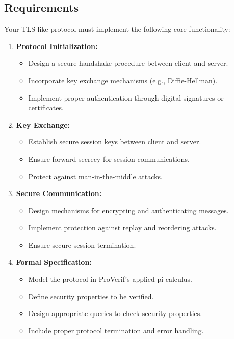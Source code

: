 \documentclass[10pt,a4paper,american]{exam}
\begin{document}
\subsection*{Requirements}
Your TLS-like protocol must implement the following core functionality:

\begin{enumerate}
	\item \textbf{Protocol Initialization:}
	      \begin{itemize}
		      \item Design a secure handshake procedure between client and server.
		      \item Incorporate key exchange mechanisms (e.g., Diffie-Hellman).
		      \item Implement proper authentication through digital signatures or certificates.
	      \end{itemize}

	\item \textbf{Key Exchange:}
	      \begin{itemize}
		      \item Establish secure session keys between client and server.
		      \item Ensure forward secrecy for session communications.
		      \item Protect against man-in-the-middle attacks.
	      \end{itemize}

	\item \textbf{Secure Communication:}
	      \begin{itemize}
		      \item Design mechanisms for encrypting and authenticating messages.
		      \item Implement protection against replay and reordering attacks.
		      \item Ensure secure session termination.
	      \end{itemize}

	\item \textbf{Formal Specification:}
	      \begin{itemize}
		      \item Model the protocol in ProVerif's applied pi calculus.
		      \item Define security properties to be verified.
		      \item Design appropriate queries to check security properties.
		      \item Include proper protocol termination and error handling.
	      \end{itemize}
\end{enumerate}
\end{document}
